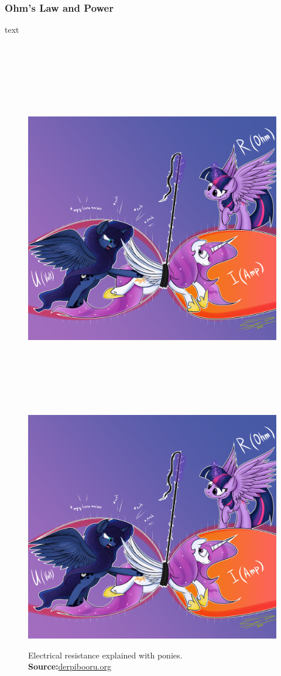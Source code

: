 \documentclass[11pt]{article}
\begin{document}
\subsubsection{Ohm's Law and Power}
text\par
\begin{figure}[!h]
  \centering
  \ifdefined\HCode
  \includegraphics[height=45em,keepaspectratio]
  {src/assets/electricity_pony.png}
  \else
  \includegraphics[height=0.7\textwidth,keepaspectratio]
  {src/assets/electricity_pony.png}
  \fi
  \caption{Electrical resistance explained with ponies.\\
  \textbf{Source:}\href{https://derpibooru.org/images/2461820?q=electrical+resistance}{derpibooru.org}}
\end{figure}
\end{document}
